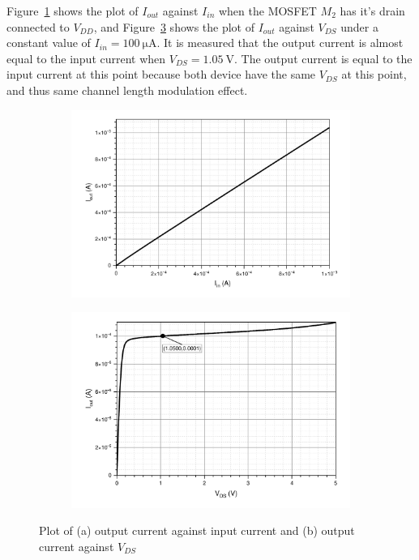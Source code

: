 \documentclass[12pt]{article}   %
\begin{document}
	Figure~\ref{fig:ioutIin} shows the plot of $I_{out}$ against $I_{in}$ when the MOSFET $M_2$ has it's drain connected to $V_{DD}$, and Figure~\ref{fig:ioutVgs} shows the plot of $I_{out}$ against $V_{DS}$ under a constant value of $I_{in} = \SI{100}{\micro\ampere}$. It is measured that the output current is almost equal to the input current when $V_{DS} = \SI{1.05}{\volt}$. The output current is equal to the input current at this point because both device have the same $V_{DS}$ at this point, and thus same channel length modulation effect.
	
	\begin{figure}[htbp]
		\centering
		\begin{subfigure}{0.48\linewidth}
			\includegraphics[width=\linewidth]{Figures/E3_Current_Mirror/Iin_Iout}
			\caption{}
			\label{fig:ioutIin}
		\end{subfigure}
		\begin{subfigure}{0.48\linewidth}
			\includegraphics[width=\linewidth]{Figures/E3_Current_Mirror/Iout_Vds}
			\caption{}
			\label{fig:ioutVgs}
		\end{subfigure}
		\caption{Plot of (a) output current against input current and (b) output current against $V_{DS}$}
	\end{figure}
	
\end{document}
